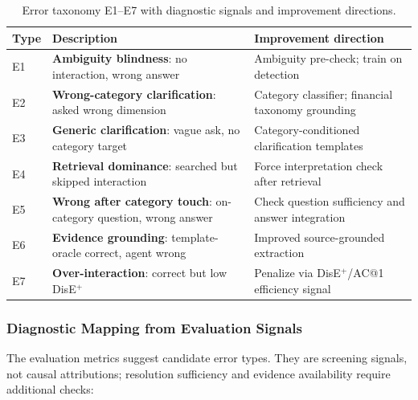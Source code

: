 \begin{table}[t]
\centering

\small
\begin{tabular}{p{}p{}p{}}
\toprule
Type & Description & Improvement direction \\
\midrule
E1 & \textbf{Ambiguity blindness}: no interaction, wrong answer
   & Ambiguity pre-check; train on detection \\
E2 & \textbf{Wrong-category clarification}: asked wrong dimension
   & Category classifier; financial taxonomy grounding \\
E3 & \textbf{Generic clarification}: vague ask, no category target
   & Category-conditioned clarification templates \\
E4 & \textbf{Retrieval dominance}: searched but skipped interaction
   & Force interpretation check after retrieval \\
E5 & \textbf{Wrong after category touch}: on-category question, wrong answer
   & Check question sufficiency and answer integration \\
E6 & \textbf{Evidence grounding}: template-oracle correct, agent wrong
   & Improved source-grounded extraction \\
E7 & \textbf{Over-interaction}: correct but low DisE$^+$
   & Penalize via DisE$^+$/AC@1 efficiency signal \\
\bottomrule
\end{tabular}
\caption{Error taxonomy E1--E7 with diagnostic signals and improvement directions.}
\label{tab:errors}
\end{table}

\subsubsection{Diagnostic Mapping from Evaluation Signals}

The evaluation metrics suggest candidate error types. They are screening signals, not causal attributions; resolution sufficiency and evidence availability require additional checks:

